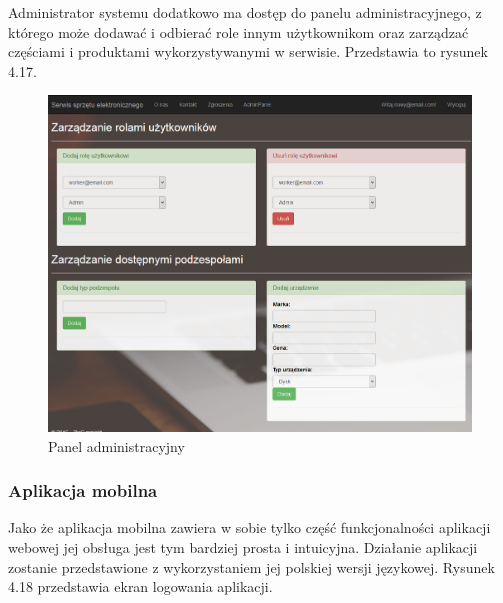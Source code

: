\documentclass[a4paper,11pt]{article}
\begin{document}
Administrator systemu dodatkowo ma dostęp do panelu administracyjnego, z którego może dodawać i odbierać role innym użytkownikom oraz zarządzać częściami i produktami wykorzystywanymi w serwisie. Przedstawia to rysunek 4.17.

\begin{figure}[h!]
	\centering
	\includegraphics[width=\textwidth,height=0.6\textheight]{serwisAdmin.png}
	\caption{Panel administracyjny}
\end{figure}

\subsubsection{Aplikacja mobilna}
Jako że aplikacja mobilna zawiera w sobie tylko część funkcjonalności aplikacji webowej jej obsługa jest tym bardziej prosta i intuicyjna. Działanie aplikacji zostanie przedstawione z wykorzystaniem jej polskiej wersji językowej. Rysunek 4.18 przedstawia ekran logowania aplikacji.
\end{document}
